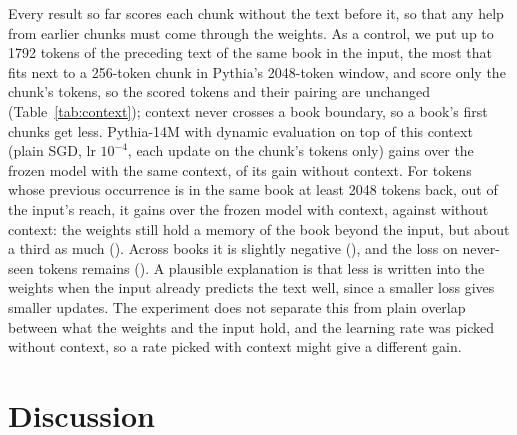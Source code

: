 \documentclass[10pt]{article}
\begin{document}
Every result so far scores each chunk without the text before it, so that any help from earlier chunks must come through the weights.
As a control, we put up to 1792 tokens of the preceding text of the same book in the input, the most that fits next to a 256-token chunk in Pythia's 2048-token window, and score only the chunk's tokens, so the scored tokens and their pairing are unchanged (Table~\ref{tab:context}); context never crosses a book boundary, so a book's first chunks get less.
Pythia-14M with dynamic evaluation on top of this context (plain SGD, lr $10^{-4}$, each update on the chunk's tokens only) gains \fcGainAllPM{} over the frozen model with the same context, \fcShareAll{} of its gain without context.
For tokens whose previous occurrence is in the same book at least 2048 tokens back, out of the input's reach, it gains \fcGainSameFarPM{} over the frozen model with context, against \fcNoContextSameFarPM{} without context: the weights still hold a memory of the book beyond the input, but about a third as much (\fcShareSameFar{}).
Across books it is slightly negative (\fcGainEarlierFarPM{}), and the loss on never-seen tokens remains (\fcGainNeverPM{}).
A plausible explanation is that less is written into the weights when the input already predicts the text well, since a smaller loss gives smaller updates.
The experiment does not separate this from plain overlap between what the weights and the input hold, and the learning rate was picked without context, so a rate picked with context might give a different gain.

\begin{table}[t]
\centering\footnotesize\setlength{\tabcolsep}{3.5pt}

\caption{Gain over frozen Pythia-14M without context, main set in reading order ($K=1$), by the token's previous occurrence (nats/token, $\pm$ SE over 25 books). Context: up to 1792 tokens of the preceding text of the same book in the input; only the chunk's tokens are scored. Dynamic evaluation: plain SGD on all parameters, lr $10^{-4}$ (picked without context), with context each update on the chunk's tokens only. The ``$\geq$ 2048'' rows hold earlier-chunk tokens whose previous occurrence is out of the input's reach. Last column: paired difference. $\dagger$: under 2 SE.}
\label{tab:context}
\end{table}

\section{Discussion}
\end{document}
